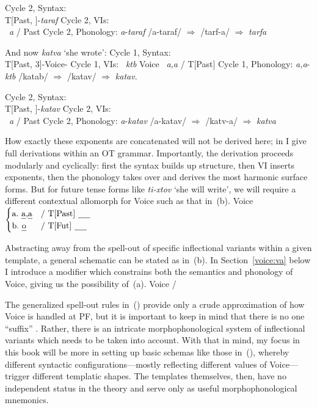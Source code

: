 {\ex Cycle 2, Syntax:\\
	T[Past, ]-\emph{taraf}
\xe
\ex Cycle 2, VIs:\\
	 \lra~\emph{a} / Past \trace
\xe
\pex Cycle 2, Phonology:
	\a \emph{a}-\emph{taraf}
	\a /a-taraf/ $\Rightarrow$ /tarf-a/ $\Rightarrow$ \emph{tarfa}
\xe

And now \emph{katva} `she wrote':
\ex Cycle 1, Syntax:\\
	T[Past, 3]-Voice-
\xe
\pex Cycle 1, VIs:
	\a {} \lra~\emph{ktb}
	\a Voice \lra~\emph{a,a} / T[Past] \trace
\xe
\pex Cycle 1, Phonology:
	\a \emph{a,a}-\emph{ktb}
	\a	/katab/ $\Rightarrow$ /katav/ $\Rightarrow$ \emph{katav}.
\xe

\ex Cycle 2, Syntax:\\
	T[Past, ]-\emph{katav}
\xe
\ex Cycle 2, VIs:\\
	 \lra~\emph{a} / Past \trace
\xe
\pex Cycle 2, Phonology:
	\a \emph{a}-\emph{katav}
	\a /a-katav/ $\Rightarrow$ /katv-a/ $\Rightarrow$ \emph{katva}
\xe

How exactly these exponents are concatenated will not be derived here; in \cite{kastner18nllt} I give full derivations within an OT grammar. Importantly, the derivation proceeds modularly and cyclically: first the syntax builds up structure, then VI inserts exponents, then the phonology takes over and derives the most harmonic surface forms. But for future tense forms like \emph{ti-xtov} `she will write', we will require a different contextual allomorph for Voice such as that in~(\nextx b).
\ex \label{vi:voice} Voice \lra $\begin{cases}
		\text{a.~\emph{a},\emph{a}} & \text{/ T[Past] \trace}\\
		\text{b.~\emph{o}} & \text{/ T[Fut] \trace}\\
		\end{cases}$
\xe

Abstracting away from the spell-out of specific inflectional variants within a given template, a general schematic can be stated as in~(\nextx b). In Section~\ref{voice:va} below I introduce a modifier which constrains both the semantics and phonology of Voice, giving us the possibility of~(\nextx a).
\pex Voice {\lra}
	\a {\tpie} / {\trace} {\va}
	\a {\tkal}
\xe

The generalized spell-out rules in~(\lastx) provide only a crude approximation of how Voice is handled at PF, but it is important to keep in mind that there is no one ``suffix'' {\tkal}. Rather, there is an intricate morphophonological system of inflectional variants which needs to be taken into account. With that in mind, my focus in this book will be more in setting up basic schemas like those in~(\lastx), whereby different syntactic configurations---mostly reflecting different values of Voice---trigger different templatic shapes. The templates themselves, then, have no independent status in the theory and serve only as useful morphophonological mnemonics.

}
